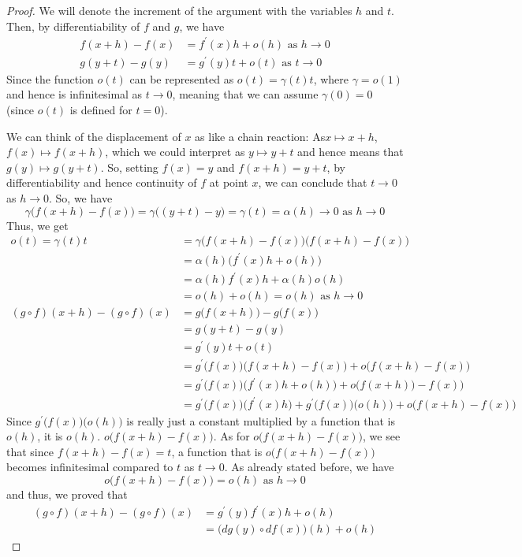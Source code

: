 \documentclass{article}
\theoremstyle{remark}
\theoremstyle{definition}
\begin{document}
\begin{proof}
We will denote the increment of the argument with the variables $h$ and $t$. Then, by differentiability of $f$ and $g$, we have
\begin{align*}
    f(x + h) - f(x) & = f^\prime (x) h + o(h) \text{ as } h \rightarrow 0 \\
    g(y + t) - g(y) & = g^\prime(y) t + o(t) \text{ as } t \rightarrow 0
\end{align*}
Since the function $o(t)$ can be represented as $o(t) = \gamma(t) t$, where $\gamma = o(1)$ and hence is infinitesimal as $t \rightarrow 0$, meaning that we can assume $\gamma(0) = 0$ (since $o(t)$ is defined for $t = 0$). 

We can think of the displacement of $x$ as like a chain reaction: As$x \mapsto x + h$, $f(x) \mapsto f(x + h)$, which we could interpret as $y \mapsto y + t$ and hence means that $g(y) \mapsto g(y + t)$. So, setting $f(x) = y$ and $f(x + h) = y + t$, by differentiability and hence continuity of $f$ at point $x$, we can conclude that $t \rightarrow 0$ as $h \rightarrow 0$. So, we have
\[\gamma\big(f(x+h) - f(x)\big) = \gamma\big( (y+t) - y\big) = \gamma(t) = \alpha(h) \rightarrow 0 \text{ as } h \rightarrow 0\]
Thus, we get 
\begin{align*}
    o(t) = \gamma(t) t & = \gamma\big( f(x + h) - f(x)\big)\big( f(x + h) - f(x)\big) \\
    & = \alpha(h) \big(f^\prime(x) h + o(h)\big) \\
    & = \alpha(h) f^\prime(x) h + \alpha(h) o(h) \\
    & = o(h) + o(h) = o(h) \text{ as } h \rightarrow 0 \\
    (g \circ f)(x + h) - (g \circ f)(x) & = g\big(f(x + h)\big) - g\big(f(x)\big) \\
    & = g (y + t) - g(y) \\
    & = g^\prime (y) t + o(t) \\
    & = g^\prime \Big(f(x)\big) \big(f(x + h) - f(x)\big) + o\big( f(x + h) - f(x)\big) \\
    & = g^\prime \big(f(x)\big) \big(f^\prime (x) h + o(h)\big) + o\big( f(x + h)\big) - f(x)\big) \\
    & = g^\prime\big( f(x) \big) \big( f^\prime (x) h\big) + g^\prime \big( f(x)\big) \big(o(h)\big) + o\big(f(x + h) - f(x)\big) 
\end{align*}
Since $g^\prime\big(f(x)\big) \big( o(h)\big)$ is really just a constant multiplied by a function that is $o(h)$, it is $o(h)$. $o\big( f(x + h) - f(x) \big)$. As for $o\big(f(x + h) - f(x)\big)$, we see that since $f(x + h) - f(x) = t$, a function that is $o\big(f(x + h) - f(x)\big)$ becomes infinitesimal compared to $t$ as $t \rightarrow 0$. As already stated before, we have
\[o\big(f(x + h) - f(x) \big) = o(h) \text{ as } h \rightarrow 0\]
and thus, we proved that
\begin{align*}
    (g \circ f)(x + h) - (g \circ f)(x) & = g^\prime (y) f^\prime (x) h + o(h) \\
    & = \big(dg(y) \circ df(x)\big) (h) + o(h)
\end{align*}
\end{proof}
\end{document}
